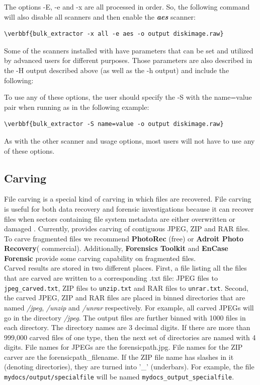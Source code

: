 \documentclass[11pt]{article} %
\begin{document}
The options -E, -e and -x are all processed in order. So, the following command will also disable all scanners and then enable the \textbf{\textit{aes}} scanner: 
\begin{Verbatim}[commandchars=\\\{\}]
\verbbf{bulk_extractor -x all -e aes -o output diskimage.raw}
\end{Verbatim} 

Some of the scanners installed with \bulk have parameters that can be set and utilized by advanced users for different purposes. Those parameters are also described in the -H output described above (as well as the -h output) and include the following:
\begingroup
\footnotesize
{
\selectfont

}
\endgroup

To use any of these options, the user should specify the -S with the name=value pair when running \bulk as in the following example:
\begin{Verbatim}[commandchars=\\\{\}]
\verbbf{bulk_extractor -S name=value -o output diskimage.raw}
\end{Verbatim} 
As with the other scanner and \bulk usage options, most users will not have to use any of these options. 

\subsection{Carving}
\label{carving}

File carving is a special kind of carving in which files are recovered. File carving is useful for both data recovery and forensic investigations because it can recover files when sectors containing file system metadata are either overwritten or damaged \cite{digitalmediatriage}. Currently, \bulk provides carving of contiguous JPEG, ZIP and RAR files. To carve fragmented files we recommend \textbf{PhotoRec} (free) or \textbf{Adroit Photo Recovery}( commercial). Additionally, \textbf{Forensics Toolkit} and \textbf{EnCase Forensic} provide some carving capability on fragmented files.\\

Carved results are stored in two different places. First, a file listing all the files that are carved are written to a corresponding .txt file: JPEG files to \texttt{jpeg_carved.txt}, ZIP files to \texttt{unzip.txt} and RAR files to \texttt{unrar.txt}. Second, the carved JPEG, ZIP and RAR files are placed in binned directories that are named \textit{/jpeg}, \textit{/unzip} and \textit{/unrar} respectively. For example, all carved JPEGs will go in the directory \textit{/jpeg}. The output files are further binned with 1000 files in each directory. The directory names are 3 decimal digits. If there are more than 999,000 carved files of one type, then the next set of directories are named with 4 digits. File names for JPEGs are the forensicpath.jpg. File names for the ZIP carver are the forensicpath\_filename. If the ZIP file name has slashes in it (denoting directories), they are turned into '\_' (underbars). For example, the file \texttt{mydocs/output/specialfile} will be named \texttt{mydocs\_output\_specialfile}. \\
\end{document}
